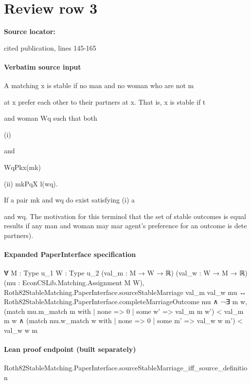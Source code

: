 \documentclass[10pt]{article}
\begin{document}
\section*{Review row 3}
\textbf{Source locator:} {\footnotesize\raggedright cited publication, lines 145-\allowbreak{}165\par}
\paragraph{Verbatim source input}
\begin{ReviewVerbatim}
A matching x is stable if no man and no woman who are not m

at x prefer each other to their partners at x. That is, x is stable if t

and woman Wq such that both

(i)

and

WqPkx(mk)

(ii) mkPqX l(wq).

If a pair mk and wq do exist satisfying (i) a

and wq. The motivation for this terminol
that the set of stable outcomes is equal
results if any man and woman may mar
agent's preference for an outcome is dete
partners).
\end{ReviewVerbatim}


\paragraph{Expanded PaperInterface specification}
\begin{ReviewVerbatim}
∀ {M : Type u_1} {W : Type u_2} (val_m : M → W → ℝ) (val_w : W → M → ℝ) (mu : EconCSLib.Matching.Assignment M W),
  Roth82StableMatching.PaperInterface.sourceStableMarriage val_m val_w mu ↔
    Roth82StableMatching.PaperInterface.completeMarriageOutcome mu ∧
      ¬∃ m w,
          (match mu.m_match m with
              | none => 0
              | some w' => val_m m w') <
              val_m m w ∧
            (match mu.w_match w with
              | none => 0
              | some m' => val_w w m') <
              val_w w m
\end{ReviewVerbatim}

\paragraph{Lean proof endpoint (built separately)}\begin{ReviewVerbatim}
Roth82StableMatching.PaperInterface.sourceStableMarriage_iff_source_definition
\end{ReviewVerbatim}
\end{document}
